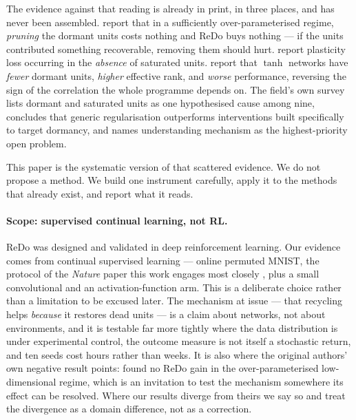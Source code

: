 \documentclass[10pt]{article}
\begin{document}
The evidence against that reading is already in print, in three places, and has
never been assembled. \citet{sokar2023dormant} report that in a sufficiently
over-parameterised regime, \emph{pruning} the dormant units costs nothing and
ReDo buys nothing --- if the units contributed something recoverable, removing
them should hurt. \citet{lyle2023understanding} report plasticity loss occurring
in the \emph{absence} of saturated units. \citet{kooi2024hadamard} report that
$\tanh$ networks have \emph{fewer} dormant units, \emph{higher} effective rank,
and \emph{worse} performance, reversing the sign of the correlation the whole
programme depends on. The field's own survey \citep{klein2024plasticity} lists
dormant and saturated units as one hypothesised cause among nine, concludes that
generic regularisation outperforms interventions built specifically to target
dormancy, and names understanding mechanism as the highest-priority open
problem.

This paper is the systematic version of that scattered evidence. We do not
propose a method. We build one instrument carefully, apply it to the methods
that already exist, and report what it reads.

\paragraph{Scope: supervised continual learning, not RL.}
ReDo was designed and validated in deep reinforcement learning. Our evidence
comes from continual supervised learning --- online permuted MNIST, the protocol
of the \emph{Nature} paper this work engages most closely
\citep{dohare2024loss}, plus a small convolutional and an activation-function
arm. This is a deliberate choice rather than a limitation to be excused later.
The mechanism at issue --- that recycling helps \emph{because} it restores dead
units --- is a claim about networks, not about environments, and it is testable
far more tightly where the data distribution is under experimental control, the
outcome measure is not itself a stochastic return, and ten seeds cost hours
rather than weeks. It is also where the original authors' own negative result
points: \citet{sokar2023dormant} found no ReDo gain in the over-parameterised
low-dimensional regime, which is an invitation to test the mechanism somewhere
its effect can be resolved. Where our results diverge from theirs we say so and
treat the divergence as a domain difference, not as a correction.
\end{document}
